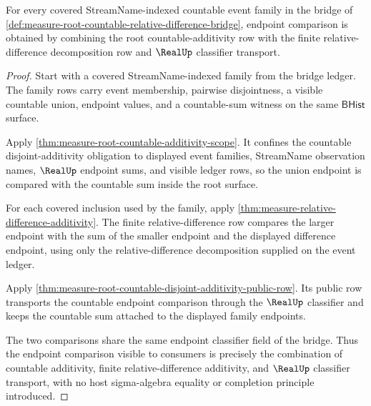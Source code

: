 \begin{theorem}
\label{thm:measure-root-countable-relative-difference-additivity}
For every covered StreamName-indexed countable event family in the bridge of
\autoref{def:measure-root-countable-relative-difference-bridge}, endpoint
comparison is obtained by combining the root countable-additivity row with
the finite relative-difference decomposition row and $\RealUp$ classifier
transport.
\end{theorem}
\begin{proof}
Start with a covered StreamName-indexed family from the bridge ledger. The
family rows carry event membership, pairwise disjointness, a visible
countable union, endpoint values, and a countable-sum witness on the same
$\mathsf{BHist}$ surface.

Apply \autoref{thm:measure-root-countable-additivity-scope}. It confines the
countable disjoint-additivity obligation to displayed event families,
StreamName observation names, $\RealUp$ endpoint sums, and visible ledger
rows, so the union endpoint is compared with the countable sum inside the
root surface.

For each covered inclusion used by the family, apply
\autoref{thm:measure-relative-difference-additivity}. The finite
relative-difference row compares the larger endpoint with the sum of the
smaller endpoint and the displayed difference endpoint, using only the
relative-difference decomposition supplied on the event ledger.

Apply \autoref{thm:measure-root-countable-disjoint-additivity-public-row}.
Its public row transports the countable endpoint comparison through the
$\RealUp$ classifier and keeps the countable sum attached to the displayed
family endpoints.

The two comparisons share the same endpoint classifier field of the bridge.
Thus the endpoint comparison visible to consumers is precisely the
combination of countable additivity, finite relative-difference additivity,
and $\RealUp$ classifier transport, with no host sigma-algebra equality or
completion principle introduced.
\end{proof}

